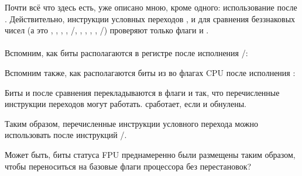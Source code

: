 



Почти всё что здесь есть, уже описано мною, кроме одного: использование \JA после \SAHF. 
Действительно, инструкции условных переходов ,  и  для сравнения беззнаковых чисел 
(а это \JA, \JAE, \JB, \JBE, \JE/\JZ, \JNA, \JNAE, \JNB, \JNBE, \JNE/\JNZ) проверяют только флаги \CF и \ZF.\\
\\
Вспомним, как биты \CThreeBits располагаются в регистре  после исполнения /\FNSTSW:



Вспомним также, как располагаются биты из  во флагах CPU после исполнения \SAHF:



Биты \Cthree и \Czero после сравнения перекладываются в флаги \ZF и \CF так, что перечисленные инструкции переходов могут работать. \JA сработает, если \CF и \ZF обнулены.

Таким образом, перечисленные инструкции условного перехода можно использовать после инструкций \FNSTSW/\SAHF.

Может быть, биты статуса FPU \CThreeBits преднамеренно были размещены таким образом, чтобы переноситься на базовые флаги процессора без перестановок?

